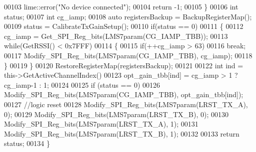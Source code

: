\begin{DoxyCode}
00103         lime::error(\textcolor{stringliteral}{"No device connected"});
00104         \textcolor{keywordflow}{return} -1;
00105     \}
00106     \textcolor{keywordtype}{int} status;
00107     \textcolor{keywordtype}{int} cg\_iamp;
00108     \textcolor{keyword}{auto} registersBackup = BackupRegisterMap();
00109     status = CalibrateTxGainSetup();
00110     \textcolor{keywordflow}{if}(status == 0)
00111     \{
00112         cg\_iamp = Get_SPI_Reg_bits(LMS7param(CG_IAMP_TBB));
00113         \textcolor{keywordflow}{while}(GetRSSI() < 0x7FFF)
00114         \{
00115             \textcolor{keywordflow}{if}(++cg\_iamp > 63)
00116                 \textcolor{keywordflow}{break};
00117             Modify_SPI_Reg_bits(LMS7param(CG_IAMP_TBB), cg\_iamp);
00118         \}
00119     \}
00120     RestoreRegisterMap(registersBackup);
00121 
00122     \textcolor{keywordtype}{int} ind = this->GetActiveChannelIndex()%
00123     opt_gain_tbb[ind] = cg\_iamp > 1 ? cg\_iamp-1 : 1;
00124 
00125     \textcolor{keywordflow}{if} (status == 0)
00126         Modify_SPI_Reg_bits(LMS7param(CG_IAMP_TBB), opt_gain_tbb[ind]);
00127     \textcolor{comment}{//logic reset}
00128     Modify_SPI_Reg_bits(LMS7param(LRST_TX_A), 0);
00129     Modify_SPI_Reg_bits(LMS7param(LRST\_TX\_B), 0);
00130     Modify_SPI_Reg_bits(LMS7param(LRST_TX_A), 1);
00131     Modify_SPI_Reg_bits(LMS7param(LRST\_TX\_B), 1);
00132 
00133     \textcolor{keywordflow}{return} status;
00134 \}
\end{DoxyCode}
